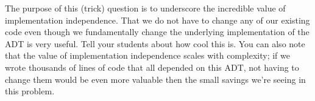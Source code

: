 \begin{parts}
    \begin{questionmeta}
        The purpose of this (trick) question is to underscore the incredible value of implementation independence. That we do not
        have to change any of our existing code even though we fundamentally change the underlying implementation of the ADT
        is very useful. Tell your students about how cool this is. You can also note that the value of implementation
        independence scales with complexity; if we wrote thousands of lines of code that all depended on this ADT, not having 
        to change them would be even more valuable then the small savings we're seeing in this problem. 
    \end{questionmeta}
\end{parts}